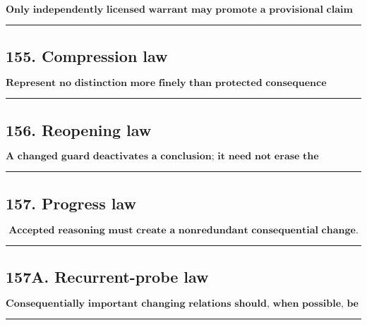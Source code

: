 \documentclass[
]{article}
\begin{document}
\[
\boxed{
\textbf{Only independently licensed warrant may promote a provisional claim into retained hard knowledge.}
}
\]

\begin{center}\rule{0.5\linewidth}{0.5pt}\end{center}

\subsection{155. Compression law}\label{compression-law}

\[
\boxed{
\textbf{Represent no distinction more finely than protected consequence requires,
and no more coarsely than protected consequence permits.}
}
\]

\begin{center}\rule{0.5\linewidth}{0.5pt}\end{center}

\subsection{156. Reopening law}\label{reopening-law}

\[
\boxed{
\textbf{A changed guard deactivates a conclusion; it need not erase the warrant that established it under its original conditions.}
}
\]

\begin{center}\rule{0.5\linewidth}{0.5pt}\end{center}

\subsection{157. Progress law}\label{progress-law}

\[
\boxed{
\textbf{Accepted reasoning must create a nonredundant consequential change.}
}
\]

\begin{center}\rule{0.5\linewidth}{0.5pt}\end{center}


\subsection{157A. Recurrent-probe law}\label{recurrent-probe-law}

\[
\boxed{
\textbf{Consequentially important changing relations should, when possible,
be observed through stable comparable probes.}
}
\]

\begin{center}\rule{0.5\linewidth}{0.5pt}\end{center}
\end{document}
